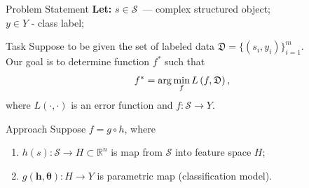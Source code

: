 \documentclass{beamer}
\begin{document}
\begin{frame}{Problem Statement}
	\textbf{Let:} $s \in \mathcal{S}$~--- complex structured object;\\
	\hspace{24pt}$y \in Y$ - class label;
	\vfill
	\begin{block}{Task}
	Suppose to be given the set of labeled data $\mathfrak{D} = \{(s_i, y_i)\}_{i=1}^m$. \\Our goal is to determine function $f^*$ such that \vspace{-0.2cm}$$f^* = \arg \min_f L\left(f, \mathfrak{D}\right),\vspace{-0.3cm}$$ where $L(\cdot, \cdot)$ is an error function and $f: \mathcal{S} \rightarrow Y$.
	\end{block}
	\vfill
	\begin{block}{Approach}
		Suppose $f = g \circ h$, where
		\begin{enumerate}
			\item $h(s): \mathcal{S} \rightarrow H \subset \mathbb{R}^n$ is map from $\mathcal{S}$ into feature space $H$;
			\item $g(\bm{h}, \bm\theta): H \rightarrow Y$ is parametric map (classification model).
		\end{enumerate}
	\end{block}
\end{frame}
\end{document}
